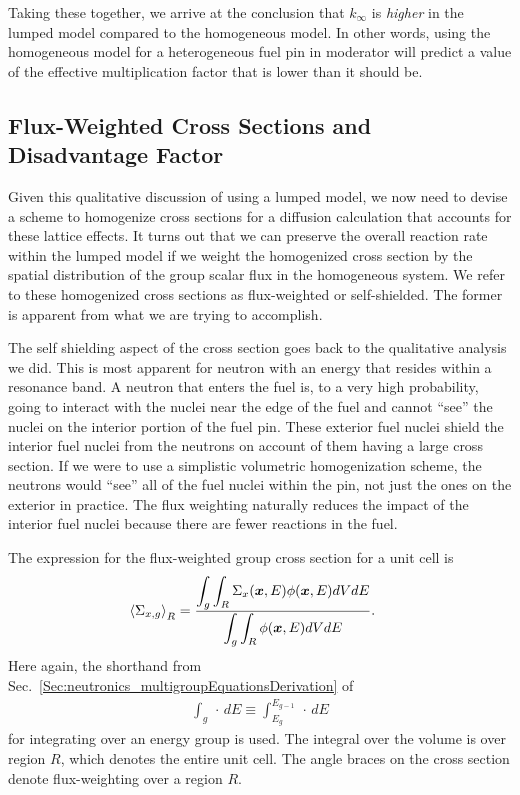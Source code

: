 Taking these together, we arrive at the conclusion that $k_\infty$ is \emph{higher} in the lumped model compared to the homogeneous model. In other words, using the homogeneous model for a heterogeneous fuel pin in moderator will predict a value of the effective multiplication factor that is lower than it should be.

\subsection{Flux-Weighted Cross Sections and Disadvantage Factor}

Given this qualitative discussion of using a lumped model, we now need to devise a scheme to homogenize cross sections for a diffusion calculation that accounts for these lattice effects. It turns out that we can preserve the overall reaction rate within the lumped model if we weight the homogenized cross section by the spatial distribution of the group scalar flux in the homogeneous system. We refer to these homogenized cross sections as flux-weighted or self-shielded. The former is apparent from what we are trying to accomplish. 

The self shielding aspect of the cross section goes back to the qualitative analysis we did. This is most apparent for neutron with an energy that resides within a resonance band. A neutron that enters the fuel is, to a very high probability, going to interact with the nuclei near the edge of the fuel and cannot ``see'' the nuclei on the interior portion of the fuel pin. These exterior fuel nuclei shield the interior fuel nuclei from the neutrons on account of them having a large cross section. If we were to use a simplistic volumetric homogenization scheme, the neutrons would ``see'' all of the fuel nuclei within the pin, not just the ones on the exterior in practice. The flux weighting naturally reduces the impact of the interior fuel nuclei because there are fewer reactions in the fuel.

The expression for the flux-weighted group cross section for a unit cell is
\begin{align}
  \left< \Sigma_{x,g} \right>_R &= \dfrac{ \displaystyle\int_g \int_R \Sigma_x(\bm{x},E) \phi(\bm{x},E) dV dE }{ \displaystyle\int_g \int_R \phi(\bm{x},E) dV dE }.
\end{align}
Here again, the shorthand from Sec.~\ref{Sec:neutronics_multigroupEquationsDerivation} of
\begin{align}
  \int_g \, \cdot \, dE \equiv \int_{E_g}^{E_{g-1}} \, \cdot \, dE \nonumber
\end{align}
for integrating over an energy group is used. The integral over the volume is over region $R$, which denotes the entire unit cell. The angle braces on the cross section denote flux-weighting over a region $R$.

